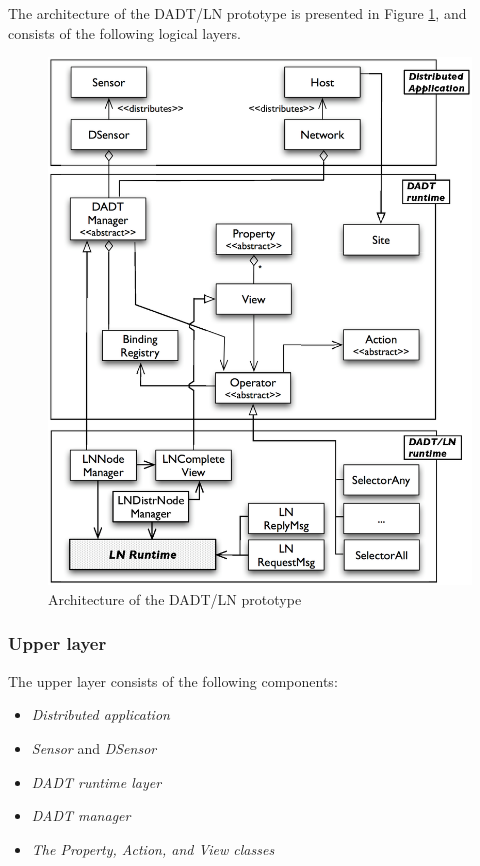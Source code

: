 The architecture of the DADT/LN prototype is presented in Figure
\ref{Fig:DADTLN_architecture}, and consists of the following logical layers.

\begin{figure}
\centering
\includegraphics[scale=0.65]{img/DADTLN_architecture.eps} 
\caption[DADT/LN architecture]{Architecture of the DADT/LN prototype}
\label{Fig:DADTLN_architecture}
\end{figure} 

\subsubsection{Upper layer}

The upper layer consists of the following components:

\begin{itemize}
\item \emph {Distributed application}
\item \emph{Sensor} and \emph{DSensor}
\item \emph{DADT runtime layer}
\item \emph{DADT manager}
\item \emph{The Property, Action, and View classes}
\end{itemize}

